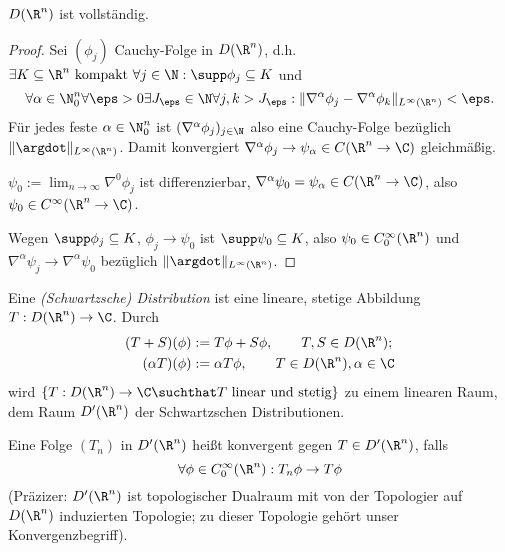 \begin{st} \label{5.3}
	$D(\R^n)$ ist vollständig.
	\begin{proof}
		Sei $(\phi_j)$ Cauchy-Folge in $D(\R^n)$, d.h. $\exists K \subset \R^n \text{ kompakt } \forall j \in \N: \supp \phi_j \subset K$ und
		\[
			\forall \alpha \in \N_0^n \forall \eps > 0 \exists J_\eps \in \N \forall j,k > J_\eps : \|\nabla^\alpha \phi_j - \nabla^\alpha \phi_k \|_{L^\infty(\R^n)} < \eps.
		\]
		Für jedes feste $\alpha \in \N_0^n$ ist $(\nabla^\alpha \phi_j)_{j\in \N}$ also eine Cauchy-Folge bezüglich $\|\argdot\|_{L^\infty(\R^n)}$.
		Damit konvergiert $\nabla^\alpha \phi_j \to \psi_\alpha \in C(\R^n \to \C)$ gleichmäßig.

		$\psi_0 := \lim_{n\to \infty} \nabla^0 \phi_j$ ist differenzierbar, $\nabla^\alpha \psi_0 = \psi_\alpha \in C(\R^n \to \C)$, also $\psi_0 \in C^\infty (\R^n \to \C)$.

		Wegen $\supp \phi_j \subset K$, $\phi_j \to \psi_0$ ist $\supp \psi_0 \subset K$, also $\psi_0 \in C_0^\infty(\R^n)$ und $\nabla^\alpha \psi_j \to \nabla^\alpha \psi_0$ bezüglich $\|\argdot\|_{L^\infty(\R^n)}$.
	\end{proof}
\end{st}

\begin{df} \label{5.4}
	Eine \emph{(Schwartzsche) Distribution} ist eine lineare, stetige Abbildung $T: D(\R^n) \to \C$.
	Durch
	\begin{align*}
		(T+S)(\phi) &:= T\phi + S\phi,  \qquad T,S \in D(\R^n);\\
		(\alpha T)(\phi) &:= \alpha T\phi,  \qquad T\in D(\R^n), \alpha \in \C
	\end{align*}
	wird $\{ T : D(\R^n) \to \C \suchthat T \text{ linear und stetig}\}$ zu einem linearen Raum, dem Raum $D'(\R^n)$ der Schwartzschen Distributionen.

	Eine Folge $(T_n)$ in $D'(\R^n)$ heißt konvergent gegen $T \in D'(\R^n)$, falls
	\[
		\forall \phi \in C_0^\infty(\R^n) : T_n\phi \to T \phi
	\]
	(Präzizer: $D'(\R^n)$ ist topologischer Dualraum mit von der Topologier auf $D(\R^n)$ induzierten Topologie; zu dieser Topologie gehört unser Konvergenzbegriff).
\end{df}


